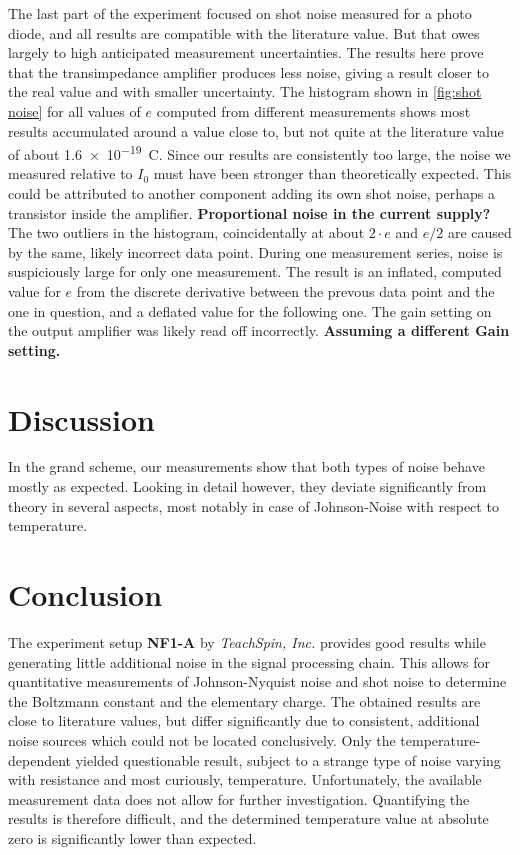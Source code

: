 \documentclass[
    parskip=half, 
    twoside=false,
    twocolumn=true,
    fontsize=11pt,
]{scrarticle}
\begin{document}
The last part of the experiment focused on shot noise measured for a photo diode, and all results are compatible with the literature value. But that owes largely to high anticipated measurement uncertainties. The results here prove that the transimpedance amplifier produces less noise, giving a result closer to the real value and with smaller uncertainty. The histogram shown in \autoref{fig:shot noise} for all values of $e$ computed from different measurements shows most results accumulated around a value close to, but not quite at the literature value of about \SI{1.6e-19}{\coulomb}. Since our results are consistently too large, the noise we measured relative to $I_0$ must have been stronger than theoretically expected. 
This could be attributed to another component adding its own shot noise, perhaps a transistor inside the amplifier. 
\textbf{Proportional noise in the current supply?}\\
The two outliers in the histogram, coincidentally at about $2 \cdot e$ and $e/2$ are caused by the same, likely incorrect data point. During one measurement series, noise is suspiciously large for only one measurement. The result is an inflated, computed value for $e$ from the discrete derivative between the prevous data point and the one in question, and a deflated value for the following one. The gain setting on the output amplifier was likely read off incorrectly.
\textbf{Assuming a different Gain setting.}

\section{Discussion}
In the grand scheme, our measurements show that both types of noise behave mostly as expected. Looking in detail however, they deviate significantly from theory in several aspects, most notably in case of Johnson-Noise with respect to temperature.

\section{Conclusion}
The experiment setup \textbf{NF1-A} by \textit{TeachSpin, Inc.} provides good results while generating little additional noise in the signal processing chain. This allows for quantitative measurements of Johnson-Nyquist noise and shot noise to determine the Boltzmann constant and the elementary charge. The obtained results are close to literature values, but differ significantly due to consistent, additional noise sources which could not be located conclusively. Only the temperature-dependent yielded questionable result, subject to a strange type of noise varying with resistance and most curiously, temperature. Unfortunately, the available measurement data does not allow for further investigation. Quantifying the results is therefore difficult, and the determined temperature value at absolute zero is significantly lower than expected.

\nocite{*}
\printbibliography
\end{document}
